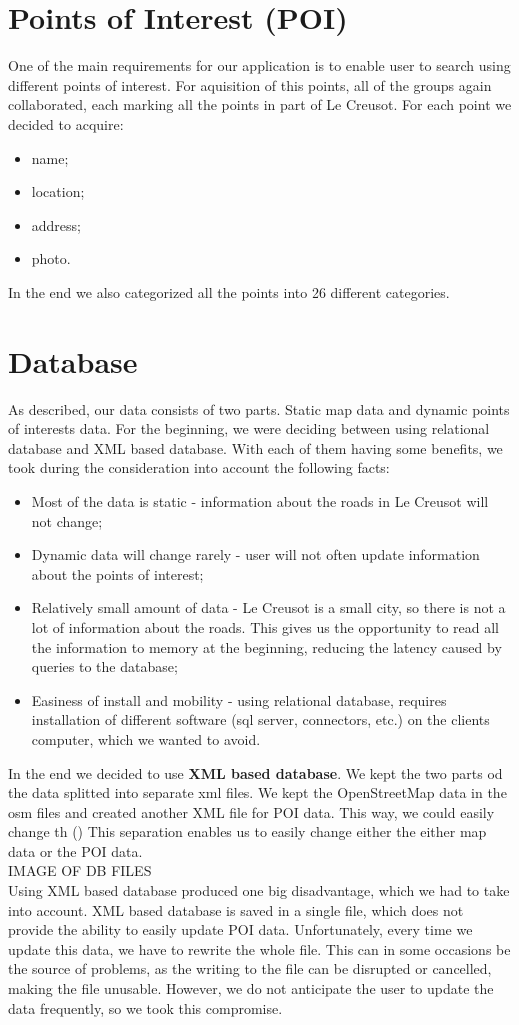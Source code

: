 \documentclass[reqno,openany,12pt]{amsbook}
\theoremstyle{definition}
\theoremstyle{remark}
\begin{document}
\section{Points of Interest (POI)}
One of the main requirements for our application is to enable user to search using different points of interest. For aquisition of this points, all of the groups again collaborated, each marking all the points in part of Le Creusot. For each point we decided to acquire:
\begin{itemize}
\item name;
\item location;
\item address;
\item photo.
\end{itemize}
In the end we also categorized all the points into 26 different categories. 

\section{Database}
As described, our data consists of two parts. Static map data and dynamic points of interests data. For the beginning, we were deciding between using relational database and XML based database. With each of them having some benefits, we took during the consideration into account the following facts:
\begin{itemize}
\item Most of the data is static - information about the roads in Le Creusot will not change;
\item Dynamic data will change rarely - user will not often update information about the points of interest;
\item Relatively small amount of data - Le Creusot is a small city, so there is not a lot of information about the roads. This gives us the opportunity to read all the information to memory at the beginning, reducing the latency caused by queries to the database;
\item Easiness of install and mobility -  using relational database, requires installation of different software (sql server, connectors, etc.) on the clients computer, which we wanted to avoid. 
\end{itemize} 
In the end we decided to use \textbf{XML based database}. We kept the two parts od the data splitted into separate xml files. We kept the OpenStreetMap data in the osm files and created another XML file for POI data. This way, we could easily change th () This separation enables us to easily change either the either map data or the POI data.
\\ IMAGE OF DB FILES
\\Using XML based database produced one big disadvantage, which we had to take into account. XML based database is saved in a single file, which does not provide the ability to easily update POI data. Unfortunately, every time we update this data, we have to rewrite the whole file. This can in some occasions be the source of problems, as the writing to the file can be disrupted or cancelled, making the file unusable. However, we do not anticipate the user to update the data frequently, so we took this compromise.
 
\end{document}
